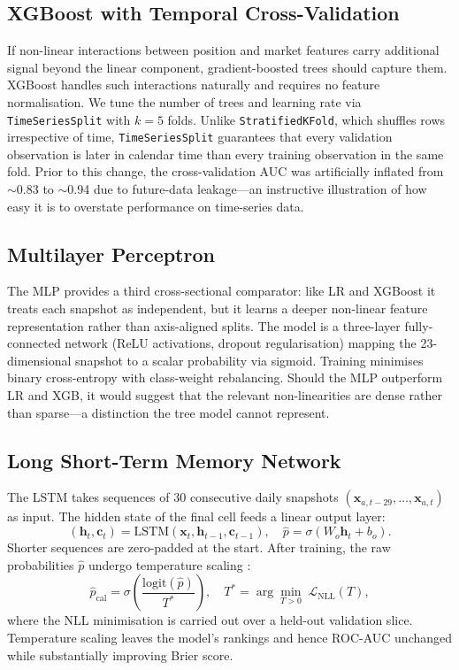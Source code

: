 \documentclass[12pt,a4paper]{article}
\newcommand{\bm}[1]{\boldsymbol{#1}}
\begin{document}
\subsection{XGBoost with Temporal Cross-Validation}

If non-linear interactions between position and market features carry
additional signal beyond the linear component, gradient-boosted trees
should capture them.  XGBoost \citep{chen2016xgboost} handles such
interactions naturally and requires no feature normalisation.  We tune the number of
trees and learning rate via \texttt{TimeSeriesSplit} with $k{=}5$ folds.
Unlike \texttt{StratifiedKFold}, which shuffles rows irrespective of time,
\texttt{TimeSeriesSplit} guarantees that every validation observation is
later in calendar time than every training observation in the same fold.
Prior to this change, the cross-validation AUC was artificially inflated
from $\sim$0.83 to $\sim$0.94 due to future-data leakage---an instructive
illustration of how easy it is to overstate performance on time-series data.

\subsection{Multilayer Perceptron}

The MLP provides a third cross-sectional comparator: like LR and XGBoost
it treats each snapshot as independent, but it learns a deeper non-linear
feature representation rather than axis-aligned splits.  The model is a
three-layer fully-connected network (ReLU activations, dropout
regularisation) mapping the 23-dimensional snapshot to a scalar probability
via sigmoid.  Training minimises binary cross-entropy with class-weight
rebalancing.  Should the MLP outperform LR and XGB, it would suggest that
the relevant non-linearities are dense rather than sparse---a distinction the
tree model cannot represent.

\subsection{Long Short-Term Memory Network}

The LSTM \citep{hochreiter1997long} takes sequences of 30 consecutive daily
snapshots $(\bm{x}_{a, t-29}, \ldots, \bm{x}_{a,t})$ as input.  The hidden
state of the final cell feeds a linear output layer:
\[
    (\bm{h}_t, \bm{c}_t) = \mathrm{LSTM}(\bm{x}_t, \bm{h}_{t-1}, \bm{c}_{t-1}),
    \quad
    \hat{p} = \sigma(W_o \bm{h}_t + b_o).
\]
Shorter sequences are zero-padded at the start.  After training, the raw
probabilities $\hat{p}$ undergo temperature scaling \citep{guo2017calibration}:
\[
    \hat{p}_\text{cal} = \sigma\!\left(\frac{\mathrm{logit}(\hat{p})}{T^*}\right),
    \quad
    T^* = \arg\min_{T>0}\; \mathcal{L}_\text{NLL}(T),
\]
where the NLL minimisation is carried out over a held-out validation slice.
Temperature scaling leaves the model's rankings and hence ROC-AUC unchanged
while substantially improving Brier score.
\end{document}
